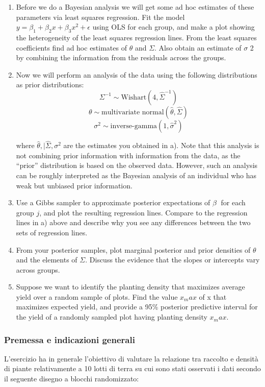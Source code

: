 \begin{enumerate}
    \item Before we do a Bayesian analysis we will get some ad hoc estimates of these parameters via
    least squares regression. Fit the model $y = \beta_1 +\beta_2 x+\beta_3 x^2 + \epsilon$ using OLS for each group,
    and make a plot showing the heterogeneity of the least squares regression lines. 
    From the least squares coefficients find ad hoc estimates of $\theta$  and $\Sigma$. 
    Also obtain an estimate of $\sigma$ 2 by combining the information from the residuals across the groups.
    \item Now we will perform an analysis of the data using the following distributions as prior distributions:
    $$ \Sigma^{-1} \sim \text{Wishart}(4, \hat\Sigma^{-1})$$
    $$ \theta \sim \text{multivariate normal} (\hat\theta, \hat\Sigma)$$
    $$ \sigma^2 \sim \text{inverse-gamma}(1, \hat\sigma^2)$$

    where $\hat\theta,|\hat\Sigma, \sigma^2 $ are the estimates you obtained in a). 
    Note that this analysis is not combining prior information with information from the data, as the “prior” distribution is based on
    the observed data. 
    However, such an analysis can be roughly interpreted as the Bayesian
    analysis of an individual who has weak but unbiased prior information.
    
    \item Use a Gibbs sampler to approximate posterior expectations of $\beta$ for each group $j$, and plot
    the resulting regression lines. Compare to the regression lines in a) above and describe why
    you see any differences between the two sets of regression lines.

    \item From your posterior samples, plot marginal posterior and prior densities of $\theta$ and the
    elements of $\Sigma$. 
    Discuss the evidence that the slopes or intercepts vary across groups.
    \item Suppose we want to identify the planting density that maximizes average yield over a
    random sample of plots. 
    Find the value $x_max$ of x that maximizes expected yield, and
    provide a 95\% posterior predictive interval for the yield of a randomly sampled plot having
    planting density $x_max$.
\end{enumerate}

\subsubsection*{Premessa e indicazioni generali}
L'esercizio ha in generale l'obiettivo di valutare la relazione tra raccolto e densità di piante
relativamente a 10 lotti di terra su cui sono stati osservati i dati secondo il seguente disegno a
blocchi randomizzato:

